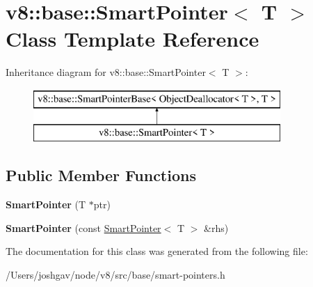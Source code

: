 \hypertarget{classv8_1_1base_1_1_smart_pointer}{}\section{v8\+:\+:base\+:\+:Smart\+Pointer$<$ T $>$ Class Template Reference}
\label{classv8_1_1base_1_1_smart_pointer}
Inheritance diagram for v8\+:\+:base\+:\+:Smart\+Pointer$<$ T $>$\+:\begin{figure}[H]
\begin{center}
\leavevmode
\includegraphics[height=2.000000cm]{classv8_1_1base_1_1_smart_pointer}
\end{center}
\end{figure}
\subsection*{Public Member Functions}
\begin{DoxyCompactItemize}
\item 
{\bfseries Smart\+Pointer} (T $\ast$ptr)\hypertarget{classv8_1_1base_1_1_smart_pointer_a6cda4b4578cedb459ddba88d3c6b6be7}{}\label{classv8_1_1base_1_1_smart_pointer_a6cda4b4578cedb459ddba88d3c6b6be7}

\item 
{\bfseries Smart\+Pointer} (const \hyperlink{classv8_1_1base_1_1_smart_pointer}{Smart\+Pointer}$<$ T $>$ \&rhs)\hypertarget{classv8_1_1base_1_1_smart_pointer_a33a7046e0e3aaaa9022d50657586d2e3}{}\label{classv8_1_1base_1_1_smart_pointer_a33a7046e0e3aaaa9022d50657586d2e3}

\end{DoxyCompactItemize}


The documentation for this class was generated from the following file\+:\begin{DoxyCompactItemize}
\item 
/\+Users/joshgav/node/v8/src/base/smart-\/pointers.\+h\end{DoxyCompactItemize}
